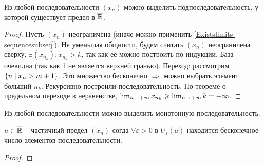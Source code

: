 \begin{theorem}
    Из любой последовательности $(x_n)$ можно выделить подпоследовательность, у которой существует предел в $\overline{\mathbb{R}}$.
    \label{Existslimits-sequencesubseqExt}
\end{theorem}
\begin{proof}
    Пусть $(x_n)$ неограничена (иначе можно применить \ref{Existslimits-sequencesubseq}). Не уменьшая общности, будем считать $(x_n)$ неограничена сверху. $\exists (x_{n_k}) : x_{n_k} > k$, так как её можно построить по индукции. База очевидна (так как 1 не является верхней гранью). Переход: рассмотрим $\{ n \;\vert\; x_n > m + 1 \}$. Это множество бесконечно $\thus$ можно выбрать элемент больший $n_k$. Рекурсивно построили последовательность. По теореме о предельном переходе в неравенстве, $\lim_{n\to+\infty} x_{n_k} \geqslant \lim_{n\to+\infty} k = +\infty$.
\end{proof}

\begin{theorem}
    Из любой последовательности можно выделить монотонную последовательность.
\end{theorem}


\begin{theorem}
    $a \in \overline{\mathbb{R}}$ -- частичный предел $(x_n)$ согда $\forall \varepsilon > 0$ в $U_\varepsilon(a)$ находится бесконечное число элементов последовательности.
    \label{SublimitCriteria}
\end{theorem}
\begin{proof}
\end{proof}

